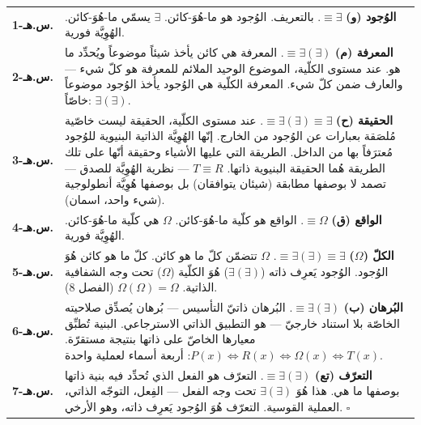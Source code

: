 \documentclass[10pt, openany, oneside]{book}
\renewcommand{\footnotesize}{\fontsize{8.5}{11}\selectfont}
\begin{document}
{\footnotesize
\noindent\begin{tabular}{r p{}}
\textbf{س.هـ-1.} & \textbf{الوُجود (و)} $\equiv \exists$. بالتعريف. الوُجود هو ما-هُوَ-كائن. $\exists$ يسمّي ما-هُوَ-كائن. الهُوِيَّة فورية. \\[0.5em]

\textbf{س.هـ-2.} & \textbf{المعرفة (م)} $\equiv \exists(\exists)$. المعرفة هي كائن يأخذ شيئاً موضوعاً ويُحدِّد ما هو. عند مستوى الكلّية، الموضوع الوحيد الملائم للمعرفة هو كلّ شيء --- والعارف ضمن كلّ شيء. المعرفة الكلّية هي الوُجود يأخذ الوُجود موضوعاً خاصّاً: $\exists(\exists)$. \\[0.5em]

\textbf{س.هـ-3.} & \textbf{الحقيقة (ح)} $\equiv \exists(\exists) \equiv \exists$. عند مستوى الكلّية، الحقيقة ليست خاصّية مُلصَقة بعبارات عن الوُجود من الخارج. إنّها الهُوِيَّة الذاتية البنيوية للوُجود مُعترَفاً بها من الداخل. الطريقة التي عليها الأشياء وحقيقة أنّها على تلك الطريقة هُما الحقيقة البنيوية ذاتها. $T \equiv R$ --- نظرية الهُوِيَّة للصدق --- تصمد لا بوصفها مطابقة (شيئان يتوافقان) بل بوصفها هُوِيَّة أنطولوجية (شيء واحد، اسمان). \\[0.5em]

\textbf{س.هـ-4.} & \textbf{الواقع (ق)} $\equiv \Omega$. الواقع هو كلّية ما-هُوَ-كائن. $\Omega$ هي كلّية ما-هُوَ-كائن. الهُوِيَّة فورية. \\[0.5em]

\textbf{س.هـ-5.} & \textbf{الكلّ ($\Omega$)} $\equiv \exists(\exists) \equiv \exists$. $\Omega$ تتضمّن كلّ ما هو كائن. كلّ ما هو كائن هُوَ الوُجود. الوُجود يَعرِف ذاته ($\exists(\exists)$) هُوَ الكلّية ($\Omega$) تحت وجه الشفافية الذاتية. $\Omega(\Omega) = \Omega$ (الفصل 8). \\[0.5em]

\textbf{س.هـ-6.} & \textbf{البُرهان (ب)} $\equiv \exists(\exists)$. البُرهان ذاتيّ التأسيس --- بُرهان يُصدِّق صلاحيته الخاصّة بلا استناد خارجيّ --- هو التطبيق الذاتي الاسترجاعي. البنية تُطبِّق معيارها الخاصّ على ذاتها بنتيجة مستقرّة. $P(x) \iff R(x) \iff \Omega(x) \iff T(x)$: أربعة أسماء لعملية واحدة. \\[0.5em]

\textbf{س.هـ-7.} & \textbf{التعرّف (تع)} $\equiv \exists(\exists)$. التعرّف هو الفعل الذي تُحدِّد فيه بنية ذاتها بوصفها ما هي. هذا هُوَ $\exists(\exists)$ تحت وجه الفعل --- الفِعل، التوجّه الذاتي، العملية القوسية. التعرّف هُوَ الوُجود يَعرِف ذاته، وهو الأرخي. $\square$ \\[0.5em]
\end{tabular}
}
\end{document}
